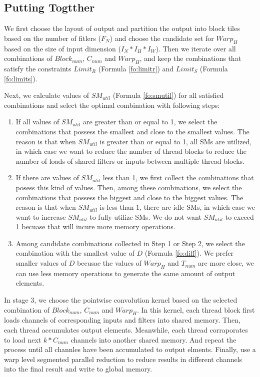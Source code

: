 \subsection{Putting Togtther}
We first choose the layout of output and partition the output into block tiles based on the number of fitlers ($F_N$) and choose the candidate set for $Warp_H$ based on the size of input dimension ($I_N*I_H*I_W$).
Then we iterate over all combinations of $Block_{num}$, $C_{num}$ and $Warp_H$, and keep the combinations that satisfy the constraints $Limit_R$ (Formula \ref{fo:limitr}) and $Limit_S$ (Formula \ref{fo:limits}).

Next, we calculate values of $SM_{util}$ (Formula \ref{fo:smutil}) for all satisfied combinations and select the optimal combination with following steps:
\begin{enumerate}[Step 1]
    \item If all values of $SM_{util}$ are greater than or equal to 1, we select the combinations that possess the smallest and close to the smallest values.
    The reason is that when $SM_{util}$ is greater than or equal to 1, all SMs are utilized, in which case we want to reduce the number of thread blocks to reduce the number of loads of shared filters or inputs between multiple thread blocks.
    \item If there are values of $SM_{util}$ less than 1, we first collect the combinations that posess this kind of values. Then, among these combinations, we select the combinations that possess the biggest and close to the biggest values.
    The reason is that when $SM_{util}$ is less than 1, there are idle SMs, in which case we want to increase $SM_{util}$ to fully utilize SMs. We do not want $SM_{util}$ to exceed 1 becuase that will incure more memory operations.
    \item Among candidate combinations collected in Step 1 or Step 2, we select the combination with the smallest value of $D$ (Formula \ref{fo:diff}).
    We prefer smaller values of $D$ becusae the values of $Warp_H$ and $T_{num}$ are more close, we can use less memory operations to generate the same amount of output elements.
\end{enumerate}

In stage 3, we choose the pointwise convolution kernel based on the selected combination of $Block_{num}$, $C_{num}$ and $Warp_H$. In this kernel, each thread block first loads channels of corresponding inputs and filters into shared memory. Then, each thread accumulates output elements. Meanwhile, each thread corraporates to load next $k*C_{num}$ channels into another shared memory. And repeat the process until all channles have been accumulated to output elments.
Finally, use a warp level segmented parallel reduction to reduce results in different channels into the final result and write to global memory.  